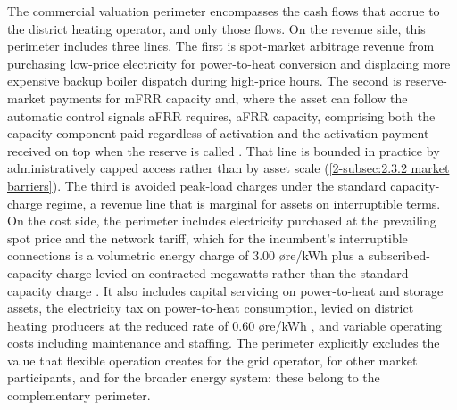 The commercial valuation perimeter encompasses the cash flows that accrue to the district heating operator, and only those flows. On the revenue side, this perimeter includes three lines. The first is spot-market arbitrage revenue from purchasing low-price electricity for power-to-heat conversion and displacing more expensive backup boiler dispatch during high-price hours. The second is reserve-market payments for mFRR capacity and, where the asset can follow the automatic control signals aFRR requires, aFRR capacity, comprising both the capacity component paid regardless of activation and the activation payment received on top when the reserve is called \cite{dalen_fleksibilitet_nodate}. That line is bounded in practice by administratively capped access rather than by asset scale (\autoref{2-subsec:2.3.2 market barriers}). The third is avoided peak-load charges under the standard capacity-charge regime, a revenue line that is marginal for assets on interruptible terms. On the cost side, the perimeter includes electricity purchased at the prevailing spot price and the network tariff, which for the incumbent's interruptible connections is a volumetric energy charge of 3.00 øre/kWh plus a subscribed-capacity charge levied on contracted megawatts rather than the standard capacity charge \cite{elvia_dagens_2022}. It also includes capital servicing on power-to-heat and storage assets, the electricity tax on power-to-heat consumption, levied on district heating producers at the reduced rate of 0.60 øre/kWh \cite{stortinget_stortingsvedtak_nodate, the_norwegian_tax_administration_arsrundskriv_nodate}, and variable operating costs including maintenance and staffing. The perimeter explicitly excludes the value that flexible operation creates for the grid operator, for other market participants, and for the broader energy system: these belong to the complementary perimeter. 

